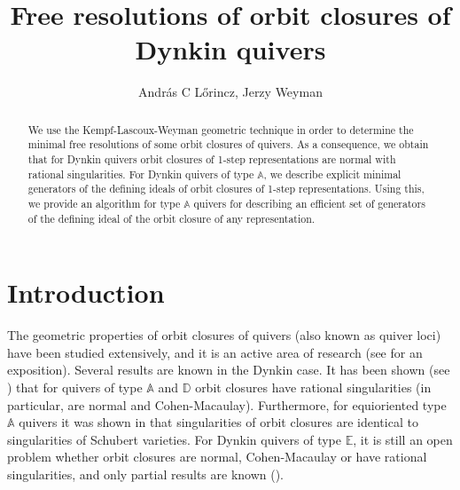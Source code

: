 \documentclass[twoside]{article}
\newcommand{\A}{\mathbb{A}}
\theoremstyle{definition}
\begin{document}
\title{Free resolutions of orbit closures of Dynkin quivers}
\author{Andr\'as C L\H{o}rincz, Jerzy Weyman}
\date{}

\maketitle

\begin{abstract}
We use the Kempf-Lascoux-Weyman geometric technique in order to determine the minimal free resolutions of some orbit closures of quivers. As a consequence, we obtain that for Dynkin quivers orbit closures of 1-step representations are normal with rational singularities. For Dynkin quivers of type $\A$, we describe explicit minimal generators of the defining ideals of orbit closures of 1-step representations. Using this, we provide an algorithm  for type $\A$ quivers for describing an efficient set of generators of the defining ideal of the orbit closure of any representation.
\end{abstract}


\vspace*{5mm}


\section*{Introduction}
\label{sec:intro}


The geometric properties of orbit closures of quivers (also known as quiver loci) have been studied extensively, and it is an active area of research (see \cite{expo} for an exposition).  Several results are known in the Dynkin case. It has been shown (see \cite{abea,orb1,orb2,ryan,lak}) that for quivers of type $\A$ and $\mathbb{D}$ orbit closures have rational singularities (in particular, are normal and Cohen-Macaulay). Furthermore, for equioriented type $\A$ quivers it was shown in \cite{lak} that singularities of orbit closures are identical to singularities of Schubert varieties. For Dynkin quivers of type $\mathbb{E}$, it is still an open problem whether orbit closures are normal, Cohen-Macaulay or have rational singularities, and only partial results are known (\cite{lol,kavita, codim}).
\end{document}
